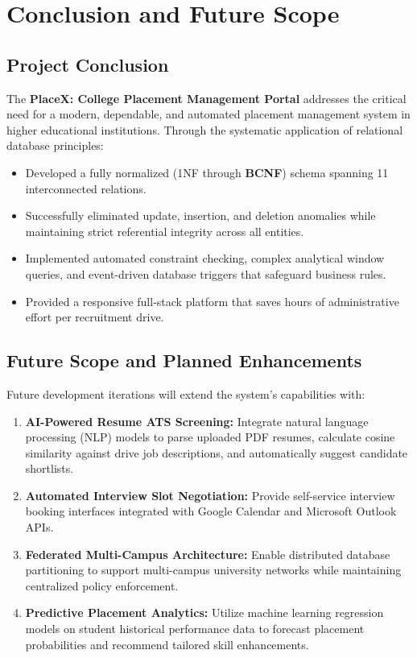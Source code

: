 \documentclass[11pt,a4paper]{article}
\begin{document}
\section{Conclusion and Future Scope}
\label{sec:conclusion_future_scope}

\subsection{Project Conclusion}
The \textbf{PlaceX: College Placement Management Portal} addresses the critical need for a modern, dependable, and automated placement management system in higher educational institutions. Through the systematic application of relational database principles:
\begin{itemize}[noitemsep]
    \item Developed a fully normalized (1NF through \textbf{BCNF}) schema spanning 11 interconnected relations.
    \item Successfully eliminated update, insertion, and deletion anomalies while maintaining strict referential integrity across all entities.
    \item Implemented automated constraint checking, complex analytical window queries, and event-driven database triggers that safeguard business rules.
    \item Provided a responsive full-stack platform that saves hours of administrative effort per recruitment drive.
\end{itemize}

\subsection{Future Scope and Planned Enhancements}
Future development iterations will extend the system's capabilities with:
\begin{enumerate}[label=\textbf{\arabic*.}]
    \item \textbf{AI-Powered Resume ATS Screening:} Integrate natural language processing (NLP) models to parse uploaded PDF resumes, calculate cosine similarity against drive job descriptions, and automatically suggest candidate shortlists.
    \item \textbf{Automated Interview Slot Negotiation:} Provide self-service interview booking interfaces integrated with Google Calendar and Microsoft Outlook APIs.
    \item \textbf{Federated Multi-Campus Architecture:} Enable distributed database partitioning to support multi-campus university networks while maintaining centralized policy enforcement.
    \item \textbf{Predictive Placement Analytics:} Utilize machine learning regression models on student historical performance data to forecast placement probabilities and recommend tailored skill enhancements.
\end{enumerate}
\end{document}
